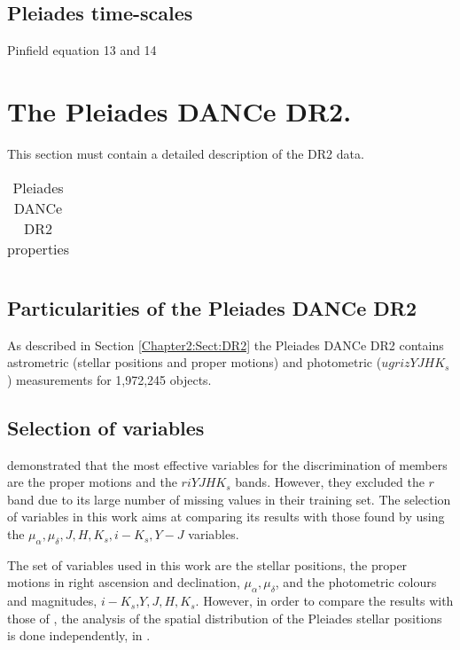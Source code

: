 \subsection{Pleiades time-scales}
Pinfield equation 13 and 14

\section{The Pleiades DANCe DR2.}
\label{sect:DR2}
This section must contain a detailed description of the DR2 data.

\begin{table}[htdp]
\caption{Pleiades DANCe DR2 properties}
\begin{center}
\begin{tabular}{|c|c|}

\end{tabular}
\end{center}
\label{tab:DR2properties}
\end{table}%
\subsection{Particularities of the Pleiades DANCe DR2}
As described in Section \ref{Chapter2:Sect:DR2} the Pleiades DANCe DR2 contains astrometric (stellar positions and proper motions) and photometric ($ugrizYJHK_s$) measurements for 1,972,245 objects. 



\subsection{Selection of variables}
\citet{Sarro2014} demonstrated that the most effective variables for the discrimination of members are the proper motions and the $riYJHK_s$ bands. However, they excluded the $r$ band due to its large number of missing values in their training set. The selection of variables in this work aims at comparing its results with those found by \citet{Bouy2015} using the $\mu_{\alpha},\mu_{\delta},J,H,K_s,i-K_s,Y-J$ variables. 

The set of variables used in this work are the stellar positions, the proper motions in right ascension and declination, $\mu_{\alpha},\mu_{\delta}$, and the photometric colours and magnitudes, $i-K_s$,$Y,J,H,K_s$. However, in order to compare the results with those of \citet{Bouy2015}, the analysis of the spatial distribution of the Pleiades stellar positions is done independently, in \citet{Olivares2017b}.


